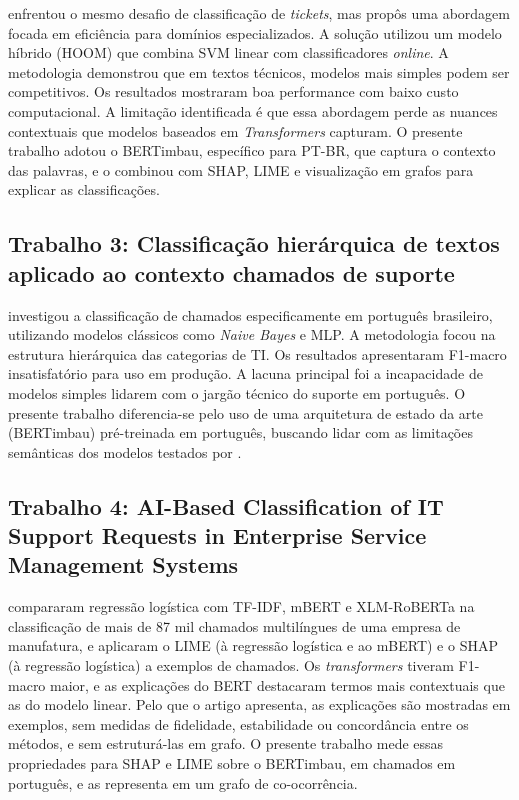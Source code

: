\documentclass[
    12pt,                %
    openright,           %
    oneside,             %
    a4paper,             %
    english,             %
    brazil               %
]{abntex2}
\begin{document}
 enfrentou o mesmo desafio de classificação de \textit{tickets}, mas propôs uma abordagem focada em eficiência para domínios especializados. A solução utilizou um modelo híbrido (HOOM) que combina SVM linear com classificadores \textit{online}. A metodologia demonstrou que em textos técnicos, modelos mais simples podem ser competitivos. Os resultados mostraram boa performance com baixo custo computacional. A limitação identificada é que essa abordagem perde as nuances contextuais que modelos baseados em \textit{Transformers} capturam. O presente trabalho adotou o BERTimbau, específico para PT-BR, que captura o contexto das palavras, e o combinou com SHAP, LIME e visualização em grafos para explicar as classificações.

\subsection{Trabalho 3: Classificação hierárquica de textos aplicado ao contexto chamados de suporte}

 investigou a classificação de chamados especificamente em português brasileiro, utilizando modelos clássicos como \textit{Naive Bayes} e MLP. A metodologia focou na estrutura hierárquica das categorias de TI. Os resultados apresentaram F1-macro insatisfatório para uso em produção. A lacuna principal foi a incapacidade de modelos simples lidarem com o jargão técnico do suporte em português. O presente trabalho diferencia-se pelo uso de uma arquitetura de estado da arte (BERTimbau) pré-treinada em português, buscando lidar com as limitações semânticas dos modelos testados por .

\subsection{Trabalho 4: AI-Based Classification of IT Support Requests in Enterprise Service Management Systems}

 compararam regressão logística com TF-IDF, mBERT e XLM-RoBERTa na classificação de mais de 87 mil chamados multilíngues de uma empresa de manufatura, e aplicaram o LIME (à regressão logística e ao mBERT) e o SHAP (à regressão logística) a exemplos de chamados. Os \textit{transformers} tiveram F1-macro maior, e as explicações do BERT destacaram termos mais contextuais que as do modelo linear. Pelo que o artigo apresenta, as explicações são mostradas em exemplos, sem medidas de fidelidade, estabilidade ou concordância entre os métodos, e sem estruturá-las em grafo. O presente trabalho mede essas propriedades para SHAP e LIME sobre o BERTimbau, em chamados em português, e as representa em um grafo de co-ocorrência.
\end{document}
